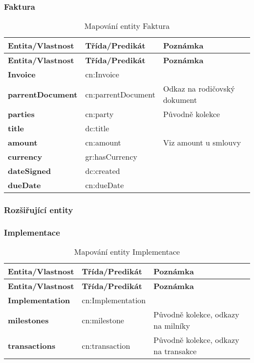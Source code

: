 \newpage

\subsubsection*{Faktura}

\begin{center}
\begin{longtable}{lp{30mm}p{65mm}}
\label{grid_mlmmh} \\
\multicolumn{1}{l}{\textbf{Entita/Vlastnost}} & 
\multicolumn{1}{l}{\textbf{Třída/Predikát}} & 
\multicolumn{1}{l}{\textbf{Poznámka}} \\ \hline 
\endfirsthead
\multicolumn{1}{l}{\textbf{Entita/Vlastnost}} & 
\multicolumn{1}{l}{\textbf{Třída/Predikát}} & 
\multicolumn{1}{l}{\textbf{Poznámka}} \\ \hline 
\hline
\endhead
\endfoot
\caption{Mapování entity Faktura}
\endlastfoot
\textbf{Invoice} & cn:Invoice \\
\textbf{parrentDocument} & cn:parrentDocument & Odkaz na rodičovský dokument \\
\textbf{parties} & cn:party & Původně kolekce \\
\textbf{title} & dc:title \\
\textbf{amount} & cn:amount & Viz amount u smlouvy \\
\textbf{currency} & gr:hasCurrency \\
\textbf{dateSigned} & dc:created \\
\textbf{dueDate} & cn:dueDate \\
\end{longtable}
\end{center}

\subsubsection*{Rozšiřující entity}

\subsubsection*{Implementace}

\begin{center}
\begin{longtable}{lp{30mm}p{65mm}}
\label{grid_mlmmh} \\
\multicolumn{1}{l}{\textbf{Entita/Vlastnost}} & 
\multicolumn{1}{l}{\textbf{Třída/Predikát}} & 
\multicolumn{1}{l}{\textbf{Poznámka}} \\ \hline 
\endfirsthead
\multicolumn{1}{l}{\textbf{Entita/Vlastnost}} & 
\multicolumn{1}{l}{\textbf{Třída/Predikát}} & 
\multicolumn{1}{l}{\textbf{Poznámka}} \\ \hline 
\hline
\endhead
\endfoot
\caption{Mapování entity Implementace}
\endlastfoot
\textbf{Implementation} & cn:Implementation & \\
\textbf{milestones} & cn:milestone & Původně kolekce, odkazy na milníky\\
\textbf{transactions} & cn:transaction & Původně kolekce, odkazy na transakce\\
\end{longtable}
\end{center}

